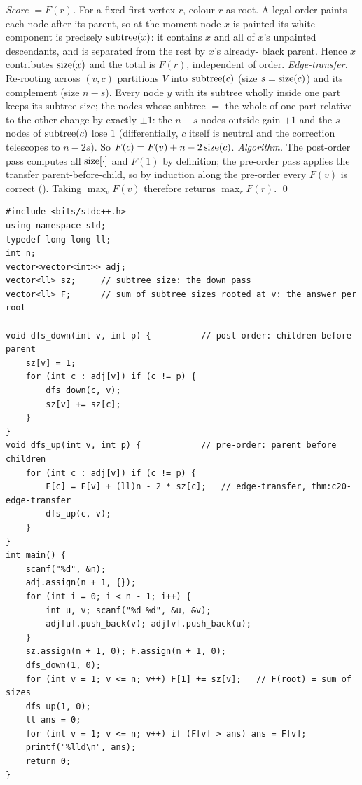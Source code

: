 \begin{proofbox}
\emph{Score $=F(r)$.} For a fixed first vertex $r$, colour $r$ as root. A legal
order paints each node after its parent, so at the moment node $x$ is painted
its white component is precisely $\operatorname{subtree}(x)$: it contains $x$ and all of
$x$'s unpainted descendants, and is separated from the rest by $x$'s already-
black parent. Hence $x$ contributes $\operatorname{size}(x)$ and the total is $F(r)$,
independent of order. \emph{Edge-transfer.} Re-rooting across $(v,c)$
partitions $V$ into $\operatorname{subtree}(c)$ (size $s=\operatorname{size}(c)$) and its complement
(size $n-s$). Every node $y$ with its subtree wholly inside one part keeps its
subtree size; the nodes whose subtree $=$ the whole of one part relative to the
other change by exactly $\pm1$: the $n-s$ nodes outside gain $+1$ and the $s$
nodes of $\operatorname{subtree}(c)$ lose $1$ (differentially, $c$ itself is neutral and the
correction telescopes to $n-2s$). So $F(c)=F(v)+n-2\operatorname{size}(c)$. \emph{Algorithm.}
The post-order pass computes all $\operatorname{size}[\cdot]$ and $F(1)$ by definition; the
pre-order pass applies the transfer parent-before-child, so by induction along
the pre-order every $F(v)$ is correct (). Taking
$\max_v F(v)$ therefore returns $\max_r F(r)$. \qed
\end{proofbox}

\begin{lstlisting}[caption={Codeforces 1187E -- the two-DFS template with Phi = + and shift = +(n - 2*size(c)); O(n), long long}, label={lst:c20-1187e-soln}]
#include <bits/stdc++.h>
using namespace std;
typedef long long ll;
int n;
vector<vector<int>> adj;
vector<ll> sz;     // subtree size: the down pass
vector<ll> F;      // sum of subtree sizes rooted at v: the answer per root

void dfs_down(int v, int p) {          // post-order: children before parent
    sz[v] = 1;
    for (int c : adj[v]) if (c != p) {
        dfs_down(c, v);
        sz[v] += sz[c];
    }
}
void dfs_up(int v, int p) {            // pre-order: parent before children
    for (int c : adj[v]) if (c != p) {
        F[c] = F[v] + (ll)n - 2 * sz[c];   // edge-transfer, thm:c20-edge-transfer
        dfs_up(c, v);
    }
}
int main() {
    scanf("%d", &n);
    adj.assign(n + 1, {});
    for (int i = 0; i < n - 1; i++) {
        int u, v; scanf("%d %d", &u, &v);
        adj[u].push_back(v); adj[v].push_back(u);
    }
    sz.assign(n + 1, 0); F.assign(n + 1, 0);
    dfs_down(1, 0);
    for (int v = 1; v <= n; v++) F[1] += sz[v];   // F(root) = sum of sizes
    dfs_up(1, 0);
    ll ans = 0;
    for (int v = 1; v <= n; v++) if (F[v] > ans) ans = F[v];
    printf("%lld\n", ans);
    return 0;
}
\end{lstlisting}

